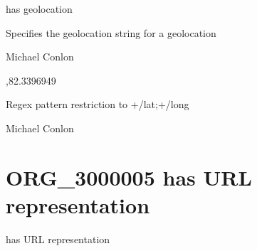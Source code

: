 \documentclass[letterpaper,10pt,english]{sphinxmanual}
\begin{document}
\begin{sphinxShadowBox}

\sphinxAtStartPar
has geolocation
\end{sphinxShadowBox}

\begin{sphinxShadowBox}

\sphinxAtStartPar
Specifies the geolocation string for a geolocation
\end{sphinxShadowBox}

\begin{sphinxShadowBox}

\sphinxAtStartPar
Michael Conlon 
\end{sphinxShadowBox}

\begin{sphinxShadowBox}

,\sphinxhyphen{}82.3396949
\end{sphinxShadowBox}

\begin{sphinxShadowBox}

\sphinxAtStartPar
Regex pattern restriction to +/\sphinxhyphen{}lat;+/\sphinxhyphen{}long
\end{sphinxShadowBox}

\begin{sphinxShadowBox}

\sphinxAtStartPar
Michael Conlon 
\end{sphinxShadowBox}
\begin{quote}
\label{\detokenize{doc-ORG_3000005:org-3000005}}\label{\detokenize{doc-ORG_3000005:has-url-representation}}\label{\detokenize{doc-ORG_3000005:org-3000005}}
\ignorespaces \end{quote}


\section{ORG\_3000005 \sphinxhyphen{} has URL representation}
\label{\detokenize{doc-ORG_3000005:org-3000005-has-url-representation}}\label{\detokenize{doc-ORG_3000005:index-0}}\label{\detokenize{doc-ORG_3000005::doc}}
\begin{sphinxShadowBox}

\sphinxAtStartPar
has URL representation
\end{sphinxShadowBox}
\end{document}
